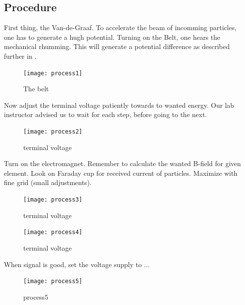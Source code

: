 \clearpage
\subsection{Procedure}
First thing, the Van-de-Graaf. To accelerate the beam of incomming particles,
one has to generate a hugh potential. Turning on the Belt, one hears the
mechanical rhumming. This will generate a potential difference as described
further in \cite[p.xx]{krane}.
\begin{figure}[h]
\centering
\texttt{[image: process1]}
\caption{The belt}
\label{fig_process1}
\end{figure}

Now adjust the terminal voltage patiently towards to wanted energy. Our lab
instructor advised us to wait for each step, before going to the next.
\begin{figure}[h]
\centering
\texttt{[image: process2]}
\caption{terminal voltage}
\label{fig_process2}
\end{figure}

Turn on the electromagnet. Remember to calculate the wanted B-field for given
element. Look on Faraday cup for received current of particles. Maximize with
fine grid (small adjustments).
\begin{figure}[h]
\centering
\texttt{[image: process3]}
\caption{terminal voltage}
\label{fig_process3}
\end{figure}

\begin{figure}[h]
\centering
\texttt{[image: process4]}
\caption{terminal voltage}
\label{fig_process4}
\end{figure}

When signal is good, set the voltage supply to ... 
\begin{figure}[h]
\centering
\texttt{[image: process5]}
\caption{process5}
\label{fig_process5}
\end{figure}







